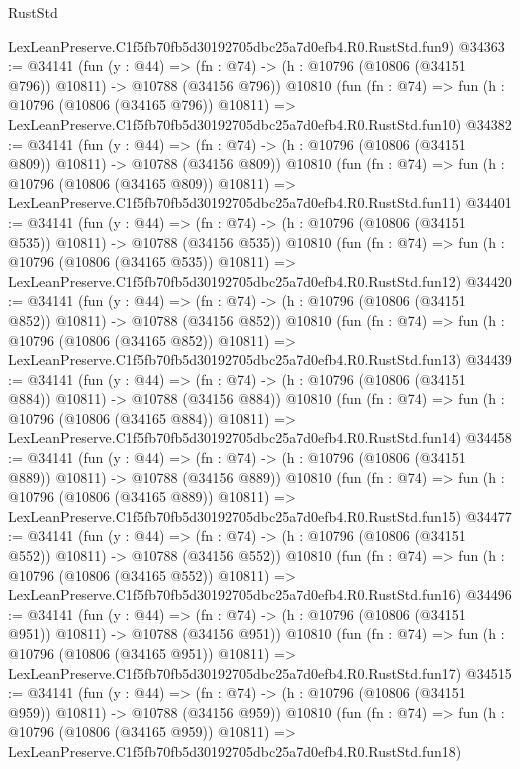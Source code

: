 \begin{lexlean}{RustStd}
\begin{coremodule}
    LexLeanPreserve.C1f5fb70fb5d30192705dbc25a7d0efb4.R0.RustStd.fun9)
@34363 := @34141
    (fun (y : @44) =>
    (fn : @74) -> (h : @10796 (@10806 (@34151 @796)) @10811) -> @10788 (@34156 @796))
    @10810
    (fun (fn : @74) =>
    fun (h : @10796 (@10806 (@34165 @796)) @10811) =>
    LexLeanPreserve.C1f5fb70fb5d30192705dbc25a7d0efb4.R0.RustStd.fun10)
@34382 := @34141
    (fun (y : @44) =>
    (fn : @74) -> (h : @10796 (@10806 (@34151 @809)) @10811) -> @10788 (@34156 @809))
    @10810
    (fun (fn : @74) =>
    fun (h : @10796 (@10806 (@34165 @809)) @10811) =>
    LexLeanPreserve.C1f5fb70fb5d30192705dbc25a7d0efb4.R0.RustStd.fun11)
@34401 := @34141
    (fun (y : @44) =>
    (fn : @74) -> (h : @10796 (@10806 (@34151 @535)) @10811) -> @10788 (@34156 @535))
    @10810
    (fun (fn : @74) =>
    fun (h : @10796 (@10806 (@34165 @535)) @10811) =>
    LexLeanPreserve.C1f5fb70fb5d30192705dbc25a7d0efb4.R0.RustStd.fun12)
@34420 := @34141
    (fun (y : @44) =>
    (fn : @74) -> (h : @10796 (@10806 (@34151 @852)) @10811) -> @10788 (@34156 @852))
    @10810
    (fun (fn : @74) =>
    fun (h : @10796 (@10806 (@34165 @852)) @10811) =>
    LexLeanPreserve.C1f5fb70fb5d30192705dbc25a7d0efb4.R0.RustStd.fun13)
@34439 := @34141
    (fun (y : @44) =>
    (fn : @74) -> (h : @10796 (@10806 (@34151 @884)) @10811) -> @10788 (@34156 @884))
    @10810
    (fun (fn : @74) =>
    fun (h : @10796 (@10806 (@34165 @884)) @10811) =>
    LexLeanPreserve.C1f5fb70fb5d30192705dbc25a7d0efb4.R0.RustStd.fun14)
@34458 := @34141
    (fun (y : @44) =>
    (fn : @74) -> (h : @10796 (@10806 (@34151 @889)) @10811) -> @10788 (@34156 @889))
    @10810
    (fun (fn : @74) =>
    fun (h : @10796 (@10806 (@34165 @889)) @10811) =>
    LexLeanPreserve.C1f5fb70fb5d30192705dbc25a7d0efb4.R0.RustStd.fun15)
@34477 := @34141
    (fun (y : @44) =>
    (fn : @74) -> (h : @10796 (@10806 (@34151 @552)) @10811) -> @10788 (@34156 @552))
    @10810
    (fun (fn : @74) =>
    fun (h : @10796 (@10806 (@34165 @552)) @10811) =>
    LexLeanPreserve.C1f5fb70fb5d30192705dbc25a7d0efb4.R0.RustStd.fun16)
@34496 := @34141
    (fun (y : @44) =>
    (fn : @74) -> (h : @10796 (@10806 (@34151 @951)) @10811) -> @10788 (@34156 @951))
    @10810
    (fun (fn : @74) =>
    fun (h : @10796 (@10806 (@34165 @951)) @10811) =>
    LexLeanPreserve.C1f5fb70fb5d30192705dbc25a7d0efb4.R0.RustStd.fun17)
@34515 := @34141
    (fun (y : @44) =>
    (fn : @74) -> (h : @10796 (@10806 (@34151 @959)) @10811) -> @10788 (@34156 @959))
    @10810
    (fun (fn : @74) =>
    fun (h : @10796 (@10806 (@34165 @959)) @10811) =>
    LexLeanPreserve.C1f5fb70fb5d30192705dbc25a7d0efb4.R0.RustStd.fun18)

\end{coremodule}
\end{lexlean}
